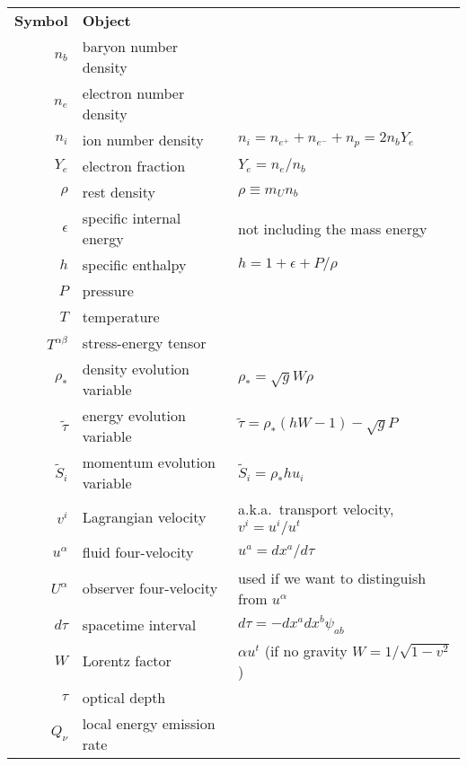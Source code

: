 \begin{table}
  \centering
  \begin{tabular}{rll}
    \textbf{Symbol}       & \textbf{Object}           & \\%
    $n_b$                 & baryon number density     & \\
    $n_e$                 & electron number density   & \\
    $n_i$                 & ion number density        & $n_i=n_{e^+}+n_{e^-}+n_p=2n_b Y_e$\\
    $Y_e$                 & electron fraction         & $Y_e=n_e/n_b$\\
    $\rho$                & rest density              & $\rho \equiv m_U n_b $ \\
    $\epsilon$            & specific internal energy  & not including the mass energy \\
    $h$                   & specific enthalpy         & $h=1+\epsilon+P/\rho$\\
    $P$                   & pressure                  & \\
    $T$                   & temperature               & \\
    $T^{\alpha \beta}$    & stress-energy tensor      & \\
    $\rho_*$              & density evolution variable& $\rho_*=\sqrt{g}W\rho$ \\
    $\tilde\tau$          & energy evolution variable & $\tilde\tau=\rho_*(hW-1)-\sqrt{g}P$ \\
    $\tilde S_i$          & momentum evolution variable & $\tilde S_i=\rho_*hu_i$\\
    $v^i$                 & Lagrangian velocity       & a.k.a.\ transport velocity, $v^i=u^i/u^t$ \\
    $u^\alpha$            & fluid four-velocity       & $u^a=dx^a/d\tau$ \\
    $U^\alpha$            & observer four-velocity    & used if we want to distinguish from $u^\alpha$ \\
    $d\tau$               & spacetime interval        & $d\tau=-dx^a dx^b \psi_{ab}$ \\
    $W$                   & Lorentz factor            & $\alpha u^t$ (if no gravity $W=1/\sqrt{1-v^2}$) \\
    $\tau$                & optical depth             & \\
    $Q_\nu$               & local energy emission rate& \\

\end{tabular}
\end{table}
